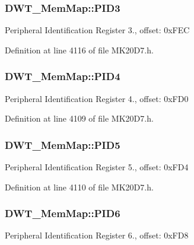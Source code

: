 \subsubsection[{\texorpdfstring{P\+I\+D3}{PID3}}]{ D\+W\+T\+\_\+\+Mem\+Map\+::\+P\+I\+D3}\hypertarget{struct_d_w_t___mem_map_a121e1947f3f7b40e9dd704fe35cd39d2}{}\label{struct_d_w_t___mem_map_a121e1947f3f7b40e9dd704fe35cd39d2}
Peripheral Identification Register 3., offset\+: 0x\+F\+EC 

Definition at line 4116 of file M\+K20\+D7.\+h.

\subsubsection[{\texorpdfstring{P\+I\+D4}{PID4}}]{ D\+W\+T\+\_\+\+Mem\+Map\+::\+P\+I\+D4}\hypertarget{struct_d_w_t___mem_map_a6479f3227be2bba4bd2784301f522723}{}\label{struct_d_w_t___mem_map_a6479f3227be2bba4bd2784301f522723}
Peripheral Identification Register 4., offset\+: 0x\+F\+D0 

Definition at line 4109 of file M\+K20\+D7.\+h.

\subsubsection[{\texorpdfstring{P\+I\+D5}{PID5}}]{ D\+W\+T\+\_\+\+Mem\+Map\+::\+P\+I\+D5}\hypertarget{struct_d_w_t___mem_map_a8b21a1c5290151d5474deb51c391b85b}{}\label{struct_d_w_t___mem_map_a8b21a1c5290151d5474deb51c391b85b}
Peripheral Identification Register 5., offset\+: 0x\+F\+D4 

Definition at line 4110 of file M\+K20\+D7.\+h.

\subsubsection[{\texorpdfstring{P\+I\+D6}{PID6}}]{ D\+W\+T\+\_\+\+Mem\+Map\+::\+P\+I\+D6}\hypertarget{struct_d_w_t___mem_map_a7c3faa2d806e506a32d9d3283e3717c2}{}\label{struct_d_w_t___mem_map_a7c3faa2d806e506a32d9d3283e3717c2}
Peripheral Identification Register 6., offset\+: 0x\+F\+D8 

